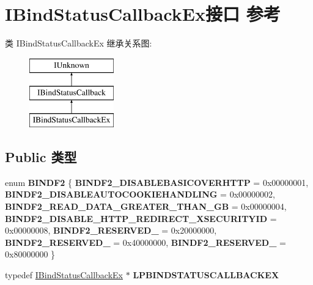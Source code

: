 \hypertarget{interface_i_bind_status_callback_ex}{}\section{I\+Bind\+Status\+Callback\+Ex接口 参考}
\label{interface_i_bind_status_callback_ex}
类 I\+Bind\+Status\+Callback\+Ex 继承关系图\+:\begin{figure}[H]
\begin{center}
\leavevmode
\includegraphics[height=3.000000cm]{interface_i_bind_status_callback_ex}
\end{center}
\end{figure}
\subsection*{Public 类型}
\begin{DoxyCompactItemize}
\item 
\mbox{\label{interface_i_bind_status_callback_ex_a7094d7a814b3f7c7a647658d56419002}} 
enum {\bfseries B\+I\+N\+D\+F2} \{ \newline
{\bfseries B\+I\+N\+D\+F2\+\_\+\+D\+I\+S\+A\+B\+L\+E\+B\+A\+S\+I\+C\+O\+V\+E\+R\+H\+T\+TP} = 0x00000001, 
{\bfseries B\+I\+N\+D\+F2\+\_\+\+D\+I\+S\+A\+B\+L\+E\+A\+U\+T\+O\+C\+O\+O\+K\+I\+E\+H\+A\+N\+D\+L\+I\+NG} = 0x00000002, 
{\bfseries B\+I\+N\+D\+F2\+\_\+\+R\+E\+A\+D\+\_\+\+D\+A\+T\+A\+\_\+\+G\+R\+E\+A\+T\+E\+R\+\_\+\+T\+H\+A\+N\+\_\+GB} = 0x00000004, 
{\bfseries B\+I\+N\+D\+F2\+\_\+\+D\+I\+S\+A\+B\+L\+E\+\_\+\+H\+T\+T\+P\+\_\+\+R\+E\+D\+I\+R\+E\+C\+T\+\_\+\+X\+S\+E\+C\+U\+R\+I\+T\+Y\+ID} = 0x00000008, 
\newline
{\bfseries B\+I\+N\+D\+F2\+\_\+\+R\+E\+S\+E\+R\+V\+E\+D\+\_} = 0x20000000, 
{\bfseries B\+I\+N\+D\+F2\+\_\+\+R\+E\+S\+E\+R\+V\+E\+D\+\_} = 0x40000000, 
{\bfseries B\+I\+N\+D\+F2\+\_\+\+R\+E\+S\+E\+R\+V\+E\+D\+\_} = 0x80000000
 \}
\item 
\mbox{\label{interface_i_bind_status_callback_ex_a1653b0f5083859e305b359a3eb43f476}} 
typedef \hyperlink{interface_i_bind_status_callback_ex}{I\+Bind\+Status\+Callback\+Ex} $\ast$ {\bfseries L\+P\+B\+I\+N\+D\+S\+T\+A\+T\+U\+S\+C\+A\+L\+L\+B\+A\+C\+K\+EX}
\end{DoxyCompactItemize}
